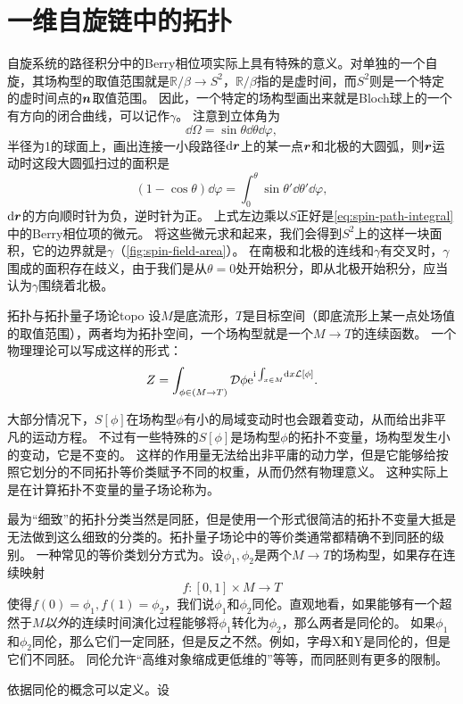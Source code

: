 \chapter{一维自旋链中的拓扑}



自旋系统的路径积分中的Berry相位项实际上具有特殊的意义。对单独的一个自旋，其场构型的取值范围就是$\mathbb{R} / \beta \rightarrow S^2$，$\mathbb{R} / \beta$指的是虚时间，而$S^2$则是一个特定的虚时间点的$\vb*{n}$取值范围。
因此，一个特定的场构型画出来就是Bloch球上的一个有方向的闭合曲线，可以记作$\gamma$。
注意到立体角为
\[
    \dd{\Omega} = \sin \theta \dd{\theta} \dd{\varphi},
\]
半径为1的球面上，画出连接一小段路径$\dd{\vb*{r}}$上的某一点$\vb*{r}$和北极的大圆弧，则$\vb*{r}$运动时这段大圆弧扫过的面积是
\[
    (1 - \cos \theta) \dd{\varphi} = \int_0^\theta \sin \theta' \dd{\theta'} \dd{\varphi},
\]
$\dd{\vb*{r}}$的方向顺时针为负，逆时针为正。
上式左边乘以$S$正好是\eqref{eq:spin-path-integral}中的Berry相位项的微元。
将这些微元求和起来，我们会得到$S^2$上的这样一块面积，它的边界就是$\gamma$（\autoref{fig:spin-field-area}）。
在南极和北极的连线和$\gamma$有交叉时，$\gamma$围成的面积存在歧义，由于我们是从$\theta=0$处开始积分，即从北极开始积分，应当认为$\gamma$围绕着北极。

\begin{back}{拓扑与拓扑量子场论}{topo}
    设$M$是底流形，$T$是目标空间（即底流形上某一点处场值的取值范围），两者均为拓扑空间，一个场构型就是一个$M \to T$的连续函数。
    一个物理理论可以写成这样的形式：
    \[
        Z = \int_{\phi \in (M \to T)} \mathcal{D} \phi \mathrm{e}^{\mathrm{i} \int_{x \in M} \dd{x} \mathcal{L}[\phi]}.
    \]

    大部分情况下，$S[\phi]$在场构型$\phi$有小的局域变动时也会跟着变动，从而给出非平凡的运动方程。
    不过有一些特殊的$S[\phi]$是场构型$\phi$的拓扑不变量，场构型发生小的变动，它是不变的。
    这样的作用量无法给出非平庸的动力学，但是它能够给按照它划分的不同拓扑等价类赋予不同的权重，从而仍然有物理意义。
    这种实际上是在计算拓扑不变量的量子场论称为。

    最为“细致”的拓扑分类当然是同胚，但是使用一个形式很简洁的拓扑不变量大抵是无法做到这么细致的分类的。拓扑量子场论中的等价类通常都精确不到同胚的级别。
    一种常见的等价类划分方式为。设$\phi_1, \phi_2$是两个$M \to T$的场构型，如果存在连续映射
    \[
        f: [0, 1] \times M \to T
    \]
    使得$f(0) = \phi_1, f(1) = \phi_2$，我们说$\phi_1$和$\phi_2$同伦。直观地看，如果能够有一个超然于$M$\emph{以外}的连续时间演化过程能够将$\phi_1$转化为$\phi_2$，那么两者是同伦的。
    如果$\phi_1$和$\phi_2$同伦，那么它们一定同胚，但是反之不然。例如，字母X和Y是同伦的，但是它们不同胚。
    同伦允许“高维对象缩成更低维的”等等，而同胚则有更多的限制。
    
    依据同伦的概念可以定义。设
\end{back}

